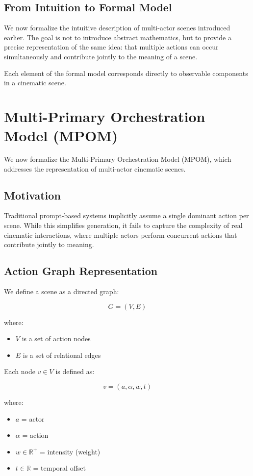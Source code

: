 \documentclass[preprints,article,submit,pdftex,moreauthors,accept]{Definitions/mdpi}
\begin{document}
\subsection{From Intuition to Formal Model}

We now formalize the intuitive description of multi-actor scenes introduced earlier. The goal is not to introduce abstract mathematics, but to provide a precise representation of the same idea: that multiple actions can occur simultaneously and contribute jointly to the meaning of a scene.

Each element of the formal model corresponds directly to observable components in a cinematic scene.
\section{Multi-Primary Orchestration Model (MPOM)}

We now formalize the Multi-Primary Orchestration Model (MPOM), which addresses the representation of multi-actor cinematic scenes.

\subsection{Motivation}

Traditional prompt-based systems implicitly assume a single dominant action per scene. While this simplifies generation, it fails to capture the complexity of real cinematic interactions, where multiple actors perform concurrent actions that contribute jointly to meaning.

\subsection{Action Graph Representation}

We define a scene as a directed graph:

\[
G = (V, E)
\]

where:
\begin{itemize}
    \item $V$ is a set of action nodes
    \item $E$ is a set of relational edges
\end{itemize}

Each node $v \in V$ is defined as:

\[
v = (a, \alpha, w, t)
\]

where:
\begin{itemize}
    \item $a$ = actor
    \item $\alpha$ = action
    \item $w \in \mathbb{R}^+$ = intensity (weight)
    \item $t \in \mathbb{R}$ = temporal offset
\end{itemize}
\end{document}
